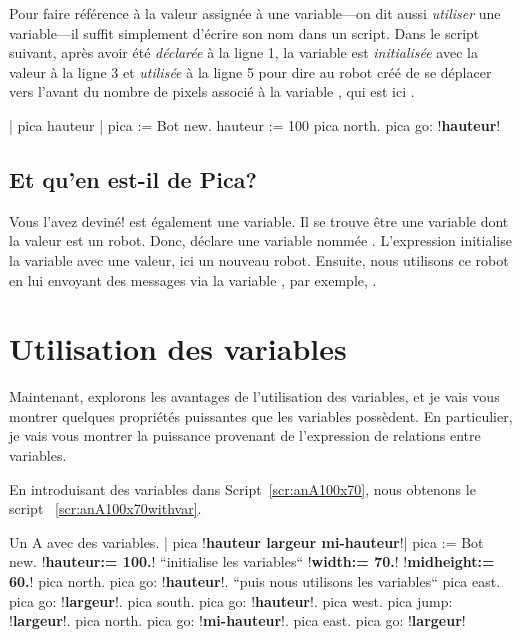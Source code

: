 \documentclass[a4paper,10pt,twoside]{book}
\begin{document}
Pour faire r\'ef\'erence \`a la valeur assign\'ee \`a une variable---on dit aussi \emph{utiliser} une variable---il suffit simplement d'\'ecrire son nom dans un script. Dans le script suivant, apr\`es avoir \'et\'e \emph{d\'eclar\'ee} \`a la ligne 1, la variable  est \emph{initialis\'ee} avec la valeur  \`a la ligne 3 et \emph{utilis\'ee} \`a la ligne 5 pour dire au robot cr\'e\'e de se d\'eplacer vers l'avant du nombre de pixels associ\'e \`a la variable , qui est ici . 

\begin{code}{}
| pica hauteur | 
pica := Bot new. 
hauteur := 100 
pica north. 
pica go: !\textbf{hauteur}!
\end{code}


\subsection{Et qu'en est-il de Pica? } 

Vous l'avez devin\'e!  est \'egalement une variable. Il se trouve \^etre une variable dont la valeur est un robot. Donc,  d\'eclare une variable nomm\'ee . L'expression   initialise la variable avec une valeur, ici un nouveau robot. Ensuite, nous utilisons ce robot en lui envoyant des messages via la variable , par exemple, . 

\section{Utilisation des variables } 

Maintenant, explorons les avantages de l'utilisation des variables, et je vais vous montrer quelques propri\'et\'es puissantes que les variables poss\`edent. En particulier, je vais vous montrer la puissance provenant de l'expression de relations entre variables. 

En introduisant des variables dans Script~\ref{scr:anA100x70}, nous obtenons le script ~\ref{scr:anA100x70withvar}.


\begin{script}{Un A avec des variables.}
| pica !\textbf{hauteur largeur mi-hauteur}!| 
pica := Bot new. 
!\textbf{hauteur:= 100.}!              ``initialise les variables`` 
!\textbf{width:= 70.}! 
!\textbf{midheight:= 60.}! 
pica north. 
pica go: !\textbf{hauteur}!.            ``puis nous utilisons les variables`` 
pica east. 
pica go: !\textbf{largeur}!. 
pica south. 
pica go: !\textbf{hauteur}!. 
pica west. 
pica jump: !\textbf{largeur}!. 
pica north. 
pica go: !\textbf{mi-hauteur}!. 
pica east. 
pica go: !\textbf{largeur}! 
\end{script}
\end{document}
